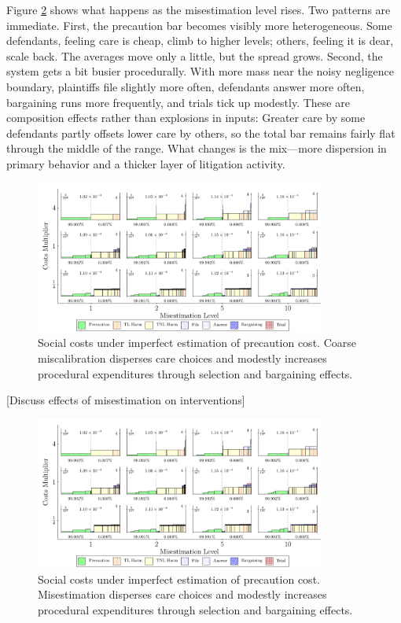 \documentclass{article}
\begin{document}
Figure \ref{fig:imperfect_estimation} shows what happens as the misestimation level rises. Two patterns are immediate. First, the precaution bar becomes visibly more heterogeneous. Some defendants, feeling care is cheap, climb to higher levels; others, feeling it is dear, scale back. The averages move only a little, but the spread grows. Second, the system gets a bit busier procedurally. With more mass near the noisy negligence boundary, plaintiffs file slightly more often, defendants answer more often, bargaining runs more frequently, and trials tick up modestly. These are composition effects rather than explosions in inputs: Greater care by some defendants partly offsets lower care by others, so the total bar remains fairly flat through the middle of the range. What changes is the mix—more dispersion in primary behavior and a thicker layer of litigation activity.

\begin{figure}[ht]
  \centering
  \includegraphics[width=0.85\textwidth]{../Figures/Cost Breakdown Misestimation Level (All Rows).pdf}
  \caption{Social costs under imperfect estimation of precaution cost. Coarse miscalibration disperses care choices and modestly increases procedural expenditures through selection and bargaining effects.}
  \label{fig:imperfect_estimation}
\end{figure}

[Discuss effects of misestimation on interventions]

\begin{figure}[ht]
  \centering
  \includegraphics[width=0.85\textwidth]{../Figures/Cost Breakdown Misestimation Level (All Rows).pdf}
  \caption{Social costs under imperfect estimation of precaution cost. Misestimation disperses care choices and modestly increases procedural expenditures through selection and bargaining effects.}
  \label{fig:imperfect_estimation}
\end{figure}
\end{document}
